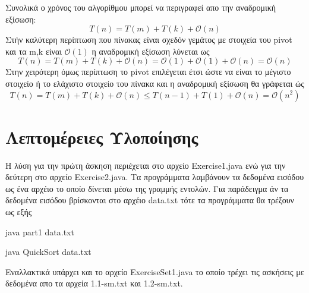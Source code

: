 \documentclass{article}
\renewcommand{\O}{\mathcal{O}}
\begin{document}
Συνολικά ο χρόνος του αλγορίθμου μπορεί να περιγραφεί απο την αναδρομική εξίσωση:
\[
	T(n) = T(m) + T(k) + \O(n)
\]
Στήν καλύτερη περίπτωση που πίνακας είναι σχεδόν γεμάτος με στοιχεία του pivot και τα m,k είναι $\O(1)$ η αναδρομική εξίσωση λύνεται ως
\[
	T(n) = T(m) + T(k) + \O(n) = \O(1) + \O(1) + \O(n) = \O(n)
\]
Στην χειρότερη όμως περίπτωση το pivot επιλέγεται έτσι ώστε να είναι το μέγιστο στοιχείο ή το ελάχιστο στοιχείο του πίνακα και η αναδρομική εξίσωση θα γράφεται ώς
\[
	T(n) = T(m) + T(k) + \O(n) \leq T(n-1) + T(1) + \O(n) = \O(n^2)
\] 
\section{Λεπτομέρειες Υλοποίησης}
Η λύση για την πρώτη άσκηση περιέχεται στο αρχείο Exercise1.java ενώ για την δεύτερη στο αρχείο Exercise2.java. Τα προγράμματα λαμβάνουν τα δεδομένα εισόδου ως ένα αρχέιο το οποίο δίνεται 
μέσω της γραμμής εντολών. Για παράδειγμα άν τα δεδομένα εισόδου βρίσκονται στο αρχέιο data.txt τότε τα προγράμματα θα τρέξουν ως εξής

\centerline{java part1 data.txt}
\centerline{java QuickSort data.txt}

Εναλλακτικά υπάρχει και το αρχείο ExerciseSet1.java το οποίο τρέχει τις ασκήσεις με δεδομένα απο τα αρχεία 1.1-sm.txt και 1.2-sm.txt. 
\end{document}
